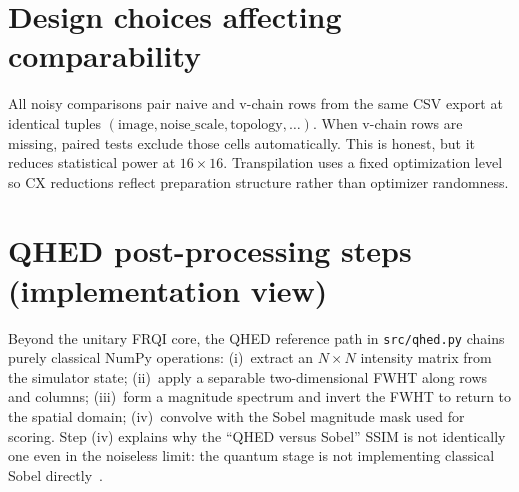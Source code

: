 \section{Design choices affecting comparability}
All noisy comparisons pair naive and v-chain rows from the same CSV export at identical tuples $(\mathrm{image},\mathrm{noise\_scale},\mathrm{topology},\ldots)$. When v-chain rows are missing, paired tests exclude those cells automatically. This is honest, but it reduces statistical power at $16\times16$. Transpilation uses a fixed optimization level so CX reductions reflect preparation structure rather than optimizer randomness.

\section{QHED post-processing steps (implementation view)}
Beyond the unitary FRQI core, the QHED reference path in \texttt{src/qhed.py} chains purely classical NumPy operations: (i)~extract an $N\times N$ intensity matrix from the simulator state; (ii)~apply a separable two-dimensional FWHT along rows and columns; (iii)~form a magnitude spectrum and invert the FWHT to return to the spatial domain; (iv)~convolve with the Sobel magnitude mask used for scoring. Step (iv) explains why the ``QHED versus Sobel'' SSIM is not identically one even in the noiseless limit: the quantum stage is not implementing classical Sobel directly~\cite{Yao2017QHED,QiskitTextbookQuantumEdgeDetection}.
